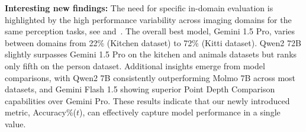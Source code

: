 \textbf{Interesting new findings:}
The need for specific in-domain evaluation is highlighted by the high performance variability across imaging domains for the same perception tasks, see  and~. The overall best model, Gemini 1.5 Pro, varies between domains from 22\% (Kitchen dataset) to 72\% (Kitti dataset). Qwen2 72B slightly surpasses Gemini 1.5 Pro on the kitchen and animals datasets but ranks only fifth on the person dataset. Additional insights emerge from model comparisons, with Qwen2 7B consistently outperforming Molmo 7B across most datasets, and Gemini Flash 1.5 showing superior Point Depth Comparison capabilities over Gemini Pro. These results indicate that our newly introduced metric, Accuracy\%($t$), can effectively capture model performance in a single value.



